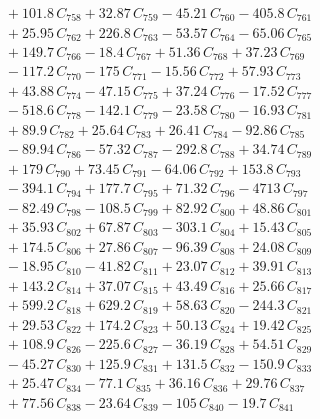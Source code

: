 \documentclass[a4paper,11pt]{article}
\begin{document}
\begin{align}
&\quad + 101.8\,C_{758} + 32.87\,C_{759} - 45.21\,C_{760} - 405.8\,C_{761} \nonumber\\
&\quad + 25.95\,C_{762} + 226.8\,C_{763} - 53.57\,C_{764} - 65.06\,C_{765} \nonumber\\
&\quad + 149.7\,C_{766} - 18.4\,C_{767} + 51.36\,C_{768} + 37.23\,C_{769} \nonumber\\
&\quad - 117.2\,C_{770} - 175\,C_{771} - 15.56\,C_{772} + 57.93\,C_{773} \nonumber\\
&\quad + 43.88\,C_{774} - 47.15\,C_{775} + 37.24\,C_{776} - 17.52\,C_{777} \nonumber\\
&\quad - 518.6\,C_{778} - 142.1\,C_{779} - 23.58\,C_{780} - 16.93\,C_{781} \nonumber\\
&\quad + 89.9\,C_{782} + 25.64\,C_{783} + 26.41\,C_{784} - 92.86\,C_{785} \nonumber\\
&\quad - 89.94\,C_{786} - 57.32\,C_{787} - 292.8\,C_{788} + 34.74\,C_{789} \nonumber\\
&\quad + 179\,C_{790} + 73.45\,C_{791} - 64.06\,C_{792} + 153.8\,C_{793} \nonumber\\
&\quad - 394.1\,C_{794} + 177.7\,C_{795} + 71.32\,C_{796} - 4713\,C_{797} \nonumber\\
&\quad - 82.49\,C_{798} - 108.5\,C_{799} + 82.92\,C_{800} + 48.86\,C_{801} \nonumber\\
&\quad + 35.93\,C_{802} + 67.87\,C_{803} - 303.1\,C_{804} + 15.43\,C_{805} \nonumber\\
&\quad + 174.5\,C_{806} + 27.86\,C_{807} - 96.39\,C_{808} + 24.08\,C_{809} \nonumber\\
&\quad - 18.95\,C_{810} - 41.82\,C_{811} + 23.07\,C_{812} + 39.91\,C_{813} \nonumber\\
&\quad + 143.2\,C_{814} + 37.07\,C_{815} + 43.49\,C_{816} + 25.66\,C_{817} \nonumber\\
&\quad + 599.2\,C_{818} + 629.2\,C_{819} + 58.63\,C_{820} - 244.3\,C_{821} \nonumber\\
&\quad + 29.53\,C_{822} + 174.2\,C_{823} + 50.13\,C_{824} + 19.42\,C_{825} \nonumber\\
&\quad + 108.9\,C_{826} - 225.6\,C_{827} - 36.19\,C_{828} + 54.51\,C_{829} \nonumber\\
&\quad - 45.27\,C_{830} + 125.9\,C_{831} + 131.5\,C_{832} - 150.9\,C_{833} \nonumber\\
&\quad + 25.47\,C_{834} - 77.1\,C_{835} + 36.16\,C_{836} + 29.76\,C_{837} \nonumber\\
&\quad + 77.56\,C_{838} - 23.64\,C_{839} - 105\,C_{840} - 19.7\,C_{841} \nonumber\\

\end{align}
\end{document}
